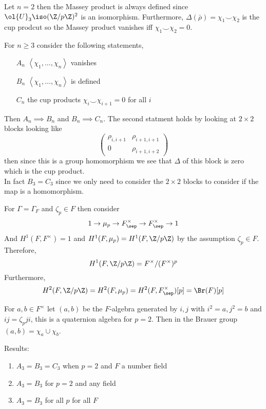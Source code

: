 \documentclass{article}
\begin{document}
\begin{example}
Let $n = 2$ then the Massey product is always defined since $\ol{U}_{3} \iso (\Z / p \Z)^2$ is an isomorphism. Furthermore, $\Delta(\bar{\rho}) = \chi_1 \smile \chi_2$ is the cup prodcut so the Massey product vanishes iff $\chi_1 \smile \chi_2 = 0$. 
\end{example}

For $n \ge 3$ consider the following statements,
\begin{enumerate}
\item[$A_n$] $\left< \chi_1, \dots, \chi_n \right>$ vanishes
\item[$B_n$] $\left< \chi_1, \dots, \chi_n \right>$ is defined
\item[$C_n$] the cup products $\chi_i \smile \chi_{i+1} = 0$ for all $i$
\end{enumerate}
Then $A_n \implies B_n$ and $B_n \implies C_n$. The second statment holds by looking at $2 \times 2$ blocks looking like
\[ \begin{pmatrix}
\rho_{i,i+1} & \rho_{i+1,i+1}
\\
0 & \rho_{i+1,i+2}
\end{pmatrix} \]
then since this is a group homomorphism we see that $\Delta$ of this block is zero which is the cup product. 
\bigskip\\
In fact $B_3 = C_3$ since we only need to consider the $2 \times 2$ blocks to consider if the map is a homomorphism. 

For $\Gamma = \Gamma_F$ and $\zeta_p \in F$ then consider
\[ 1 \to \mu_p \to F_{\sep}^\times \to F_{\sep}^\times \to 1 \]
And $H^1(F, F^\times) = 1$ and $H^1(F, \mu_p) = H^1(F, \Z / p \Z)$ by the assumption $\zeta_p \in F$. Therefore,
\[ H^1(F, \Z / p \Z) = F^\times / (F^\times)^p \]
Furthermore,
\[ H^2(F, \Z / p \Z) = H^2(F, \mu_p) = H^2(F, F_{\sep}^\times)[p] = \Br(F)[p] \]

\begin{example}
For $a,b \in F^\times$ let $(a,b)$ be the $F$-algebra generated by $i,j$ with $i^2 = a, j^2 = b$ and $ij =  \zeta_p ji$, this is a quaternion algebra for $p = 2$. Then in the Brauer group $(a,b) = \chi_a \cup \chi_b$.
\end{example}

Results:
\begin{enumerate}
\item $A_3 = B_3 = C_3$ when $p = 2$ and $F$ a number field
\item $A_3 = B_3$ for $p = 2$ and any field
\item $A_3 = B_3$ for all $p$ for all $F$
\end{enumerate}
\end{document}
